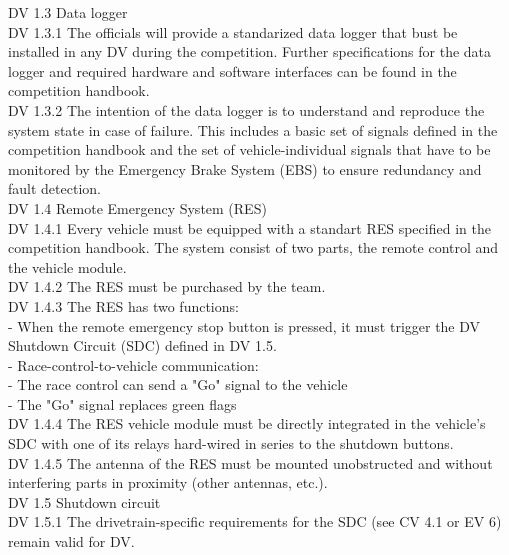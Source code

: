 \documentclass{article}
\begin{document}
DV 1.3 Data logger\\

DV 1.3.1 The officials will provide a standarized data logger that bust be installed in any DV during the competition. Further specifications for the data logger and required hardware and software interfaces can be found in the competition handbook.\\

DV 1.3.2 The intention of the data logger is to understand and reproduce the system state in case of failure. This includes a basic set of signals defined in the competition handbook and the set of vehicle-individual signals that have to be monitored by the Emergency Brake System (EBS) to ensure redundancy and fault detection.\\

DV 1.4 Remote Emergency System (RES)\\

DV 1.4.1 Every vehicle must be equipped with a standart RES specified in the competition handbook. The system consist of two parts, the remote control and the vehicle module.\\

DV 1.4.2 The RES must be purchased by the team.\\

DV 1.4.3 The RES has two functions:\\
	- When the remote emergency stop button is pressed, it must trigger the DV Shutdown Circuit (SDC) defined in DV 1.5.\\
	- Race-control-to-vehicle communication:\\
		- The race control can send a "Go" signal to the vehicle\\
		- The "Go" signal replaces green flags\\
		
DV 1.4.4 The RES vehicle module must be directly integrated in the vehicle's SDC with one of its relays hard-wired in series to the shutdown buttons.\\

DV 1.4.5 The antenna of the RES must be mounted unobstructed and without interfering parts in proximity (other antennas, etc.).\\

DV 1.5 Shutdown circuit\\

DV 1.5.1 The drivetrain-specific requirements for the SDC (see CV 4.1 or EV 6) remain valid for DV.\\
\end{document}
